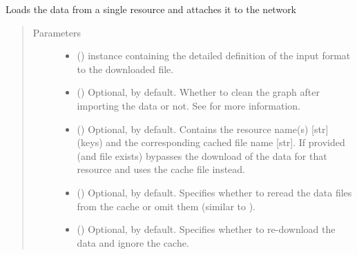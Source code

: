 \documentclass[letterpaper,10pt,english]{sphinxmanual}
\begin{document}
\begin{fulllineitems}
\begin{fulllineitems}
\label{\detokenize{reference:pypath.main.PyPath.load_resource}}
Loads the data from a single resource and attaches it to the
network
\begin{quote}\begin{description}
\item[{Parameters}] \leavevmode\begin{itemize}
\item {} 
 () \textendash{}  instance
containing the detailed definition of the input format to
the downloaded file.

\item {} 
 () \textendash{} Optional,  by default. Whether to clean the graph
after importing the data or not. See
{\hyperref[\detokenize{reference:pypath.main.PyPath.clean_graph}]{}} for more
information.

\item {} 
 () \textendash{} Optional, \sphinxcode{\sphinxupquote{\{\}}} by default. Contains the resource name(s)
{[}str{]} (keys) and the corresponding cached file name {[}str{]}.
If provided (and file exists) bypasses the download of the
data for that resource and uses the cache file instead.

\item {} 
 () \textendash{} Optional,  by default. Specifies whether to reread
the data files from the cache or omit them (similar to
).

\item {} 
 () \textendash{} Optional,  by default. Specifies whether to
re-download the data and ignore the cache.


\end{itemize}
\end{description}
\end{quote}
\end{fulllineitems}
\end{fulllineitems}
\end{document}
